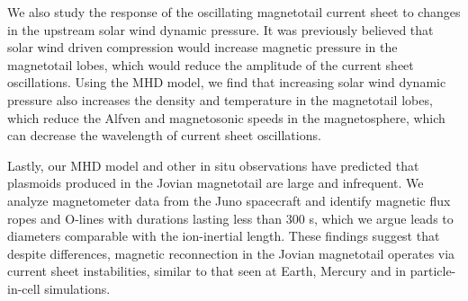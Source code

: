 We also study the response of the oscillating magnetotail current sheet to changes in the upstream solar wind dynamic pressure. It was previously believed that solar wind driven compression would increase magnetic pressure in the magnetotail lobes, which would reduce the amplitude of the current sheet oscillations. Using the MHD model, we find that increasing solar wind dynamic pressure also increases the density and temperature in the magnetotail lobes, which reduce the Alfven and magnetosonic speeds in the magnetosphere, which can decrease the wavelength of current sheet oscillations. 

Lastly, our MHD model and other in situ observations have predicted that plasmoids produced in the Jovian magnetotail are large and infrequent. We analyze magnetometer data from the Juno spacecraft and identify magnetic flux ropes and O-lines with durations lasting less than 300 s, which we argue leads to diameters comparable with the ion-inertial length. These findings suggest that despite differences, magnetic reconnection in the Jovian magnetotail operates via current sheet instabilities, similar to that seen at Earth, Mercury and in particle-in-cell simulations. 

